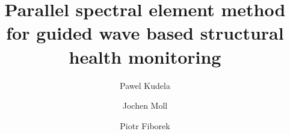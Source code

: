 \documentclass[preprint,12pt]{elsarticle}
\begin{document}
	\begin{frontmatter}
		
		\title{Parallel spectral element method for guided wave based structural health monitoring}
		
		\address[IFFM]{Institute of Fluid Flow Machinery, Polish Academy of Sciences, Poland}
		\address[UG]{J.W. Goethe--University, Department of Physics, 60438 Frankfurt, Germany}
		

		
		\author{Pawel Kudela}
		\author{Jochen Moll}
		\author{Piotr Fiborek }
		
		

\end{frontmatter}
\end{document}
